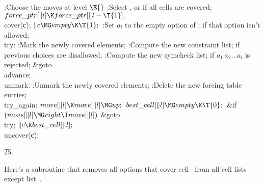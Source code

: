 \Y\B\4:Choose the moves at level \X${}\E{}$\6
:Select , or  if
all cells are covered\X;\6
${}\\{force\_ptr}[\|l]\K\\{force\_ptr}[\|l-\T{1}];{}$\6
\\{cover}(\|c);\6
${}\|c\MG\\{empty}\K\T{1};{}$\6
:Set $a_l$ to the empty option of ;  if
that option isn't allowed\X;\6
\4\\{try}:\5
:Mark the newly covered elements\X;\6
:Compute the new constraint list;  if previous
choices are disallowed\X;\6
:Compute the new symcheck list;  if $a_1\,a_2\ldots
a_l$ is rejected\X;\6
\&{goto} \\{advance};\6
\4\\{unmark}:\5
:Unmark the newly covered elements\X;\6
:Delete the new forcing table entries\X;\6
\4\\{try\_again}:\5
${}\\{move}[\|l]\K\\{move}[\|l]\MG\\{up};{}$\6
${}\\{best\_cell}[\|l]\MG\\{empty}\K\T{0};{}$\6
\&{if} ${}(\\{move}[\|l]\MG\\{right}\I\\{move}[\|l]){}$\1\5
\&{goto} \\{try};\2\6
${}\|c\K\\{best\_cell}[\|l];{}$\6
\\{uncover}(\|c);\par
\U25.\fi

Here's a subroutine that removes all options that cover cell~
from all
cell lists except list~.

